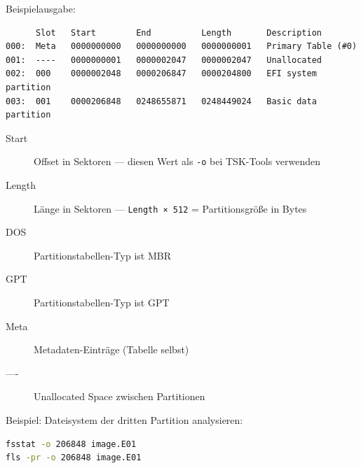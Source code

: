 Beispielausgabe:
\begin{lstlisting}
      Slot   Start        End          Length       Description
000:  Meta   0000000000   0000000000   0000000001   Primary Table (#0)
001:  ----   0000000001   0000002047   0000002047   Unallocated
002:  000    0000002048   0000206847   0000204800   EFI system partition
003:  001    0000206848   0248655871   0248449024   Basic data partition
\end{lstlisting}

\begin{description}
	\item[Start] Offset in Sektoren — diesen Wert als \texttt{-o} bei TSK-Tools verwenden
	\item[Length] Länge in Sektoren — \texttt{Length × 512} = Partitionsgröße in Bytes
	\item[DOS] Partitionstabellen-Typ ist MBR
	\item[GPT] Partitionstabellen-Typ ist GPT
	\item[Meta] Metadaten-Einträge (Tabelle selbst)
	\item[----] Unallocated Space zwischen Partitionen
\end{description}

Beispiel: Dateisystem der dritten Partition analysieren:
\begin{lstlisting}[language=bash]
fsstat -o 206848 image.E01
fls -pr -o 206848 image.E01
\end{lstlisting}
